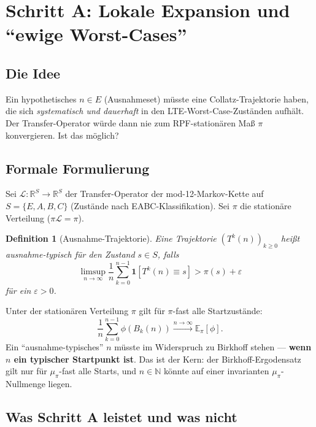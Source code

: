\documentclass[12pt,a4paper]{article}
\newtheorem{definition}{Definition}[section]
\newcommand{\N}{\mathbb{N}}
\newcommand{\R}{\mathbb{R}}
\newcommand{\Epi}{\mathbb{E}_\pi}
\begin{document}
\section{Schritt A: Lokale Expansion und ``ewige Worst-Cases''}
\label{sec:schrittA}

\subsection{Die Idee}

Ein hypothetisches $n \in E$ (Ausnahmeset) müsste eine Collatz-Trajektorie
haben, die sich \emph{systematisch und dauerhaft} in den LTE-Worst-Case-Zuständen
aufhält. Der Transfer-Operator würde dann nie zum RPF-stationären Maß $\pi$
konvergieren. Ist das möglich?

\subsection{Formale Formulierung}

Sei $\mathcal{L}: \R^S \to \R^S$ der Transfer-Operator der mod-12-Markov-Kette
auf $S = \{E, A, B, C\}$ (Zustände nach EABC-Klassifikation). Sei $\pi$ die
stationäre Verteilung ($\pi \mathcal{L} = \pi$).

\begin{definition}[Ausnahme-Trajektorie]
Eine Trajektorie $(T^k(n))_{k\geq 0}$ heißt \emph{ausnahme-typisch} für den
Zustand $s \in S$, falls
\[
  \limsup_{n\to\infty}\frac{1}{n}\sum_{k=0}^{n-1}\mathbf{1}[T^k(n) \equiv s]
  > \pi(s) + \varepsilon
\]
für ein $\varepsilon > 0$.
\end{definition}

\begin{tcolorbox}[kingman, title={Was Birkhoff/RPF über Ausnahmen sagt}]
Unter der stationären Verteilung $\pi$ gilt für $\pi$-fast alle Startzustände:
\[
  \frac{1}{n}\sum_{k=0}^{n-1}\phi(B_k(n)) \xrightarrow{n\to\infty} \Epi[\phi].
\]
Ein ``ausnahme-typisches'' $n$ müsste im Widerspruch zu Birkhoff stehen ---
\textbf{wenn $n$ ein typischer Startpunkt ist}. Das ist der Kern:
der Birkhoff-Ergodensatz gilt nur für $\mu_\pi$-fast alle Starts,
und $n \in \N$ könnte auf einer invarianten $\mu_\pi$-Nullmenge liegen.
\end{tcolorbox}

\subsection{Was Schritt A leistet und was nicht}
\end{document}
